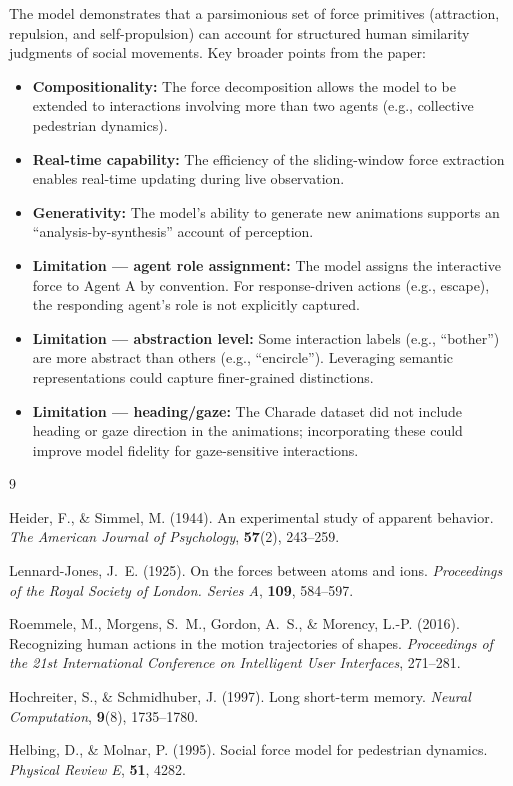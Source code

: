 \documentclass[11pt,a4paper]{article}
\begin{document}
The model demonstrates that a parsimonious set of force primitives (attraction, repulsion, and self-propulsion) can account for structured human similarity judgments of social movements. Key broader points from the paper:

\begin{itemize}
    \item \textbf{Compositionality:} The force decomposition allows the model to be extended to interactions involving more than two agents (e.g., collective pedestrian dynamics).
    \item \textbf{Real-time capability:} The efficiency of the sliding-window force extraction enables real-time updating during live observation.
    \item \textbf{Generativity:} The model's ability to generate new animations supports an ``analysis-by-synthesis'' account of perception.
    \item \textbf{Limitation --- agent role assignment:} The model assigns the interactive force to Agent A by convention. For response-driven actions (e.g., escape), the responding agent's role is not explicitly captured.
    \item \textbf{Limitation --- abstraction level:} Some interaction labels (e.g., ``bother'') are more abstract than others (e.g., ``encircle''). Leveraging semantic representations could capture finer-grained distinctions.
    \item \textbf{Limitation --- heading/gaze:} The Charade dataset did not include heading or gaze direction in the animations; incorporating these could improve model fidelity for gaze-sensitive interactions.
\end{itemize}

\begin{thebibliography}{9}

Heider, F., \& Simmel, M. (1944).
An experimental study of apparent behavior.
\textit{The American Journal of Psychology}, \textbf{57}(2), 243--259.

Lennard-Jones, J.\ E. (1925).
On the forces between atoms and ions.
\textit{Proceedings of the Royal Society of London. Series A}, \textbf{109}, 584--597.

Roemmele, M., Morgens, S.\ M., Gordon, A.\ S., \& Morency, L.-P. (2016).
Recognizing human actions in the motion trajectories of shapes.
\textit{Proceedings of the 21st International Conference on Intelligent User Interfaces}, 271--281.

Hochreiter, S., \& Schmidhuber, J. (1997).
Long short-term memory.
\textit{Neural Computation}, \textbf{9}(8), 1735--1780.

Helbing, D., \& Molnar, P. (1995).
Social force model for pedestrian dynamics.
\textit{Physical Review E}, \textbf{51}, 4282.

\end{thebibliography}
\end{document}
